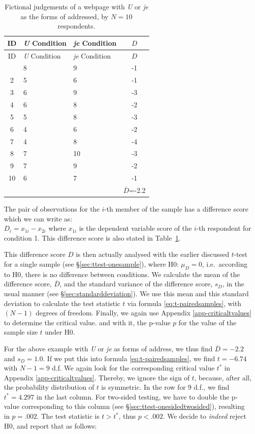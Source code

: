 \documentclass[
]{book}
\begin{document}
\begin{longtable}[]{@{}cllc@{}}
\caption{\label{tab:data-uje-paired} Fictional judgements of a webpage
with \emph{U} or \emph{je} as the forms of addressed, by \(N=10\) respondents.}\tabularnewline
\toprule\noalign{}
ID & \emph{U} Condition & \emph{je} Condition & \(D\) \\
\midrule\noalign{}
\endfirsthead
\toprule\noalign{}
ID & \emph{U} Condition & \emph{je} Condition & \(D\) \\
\midrule\noalign{}
\endhead
\bottomrule\noalign{}
\endlastfoot
1 & 8 & 9 & -1 \\
2 & 5 & 6 & -1 \\
3 & 6 & 9 & -3 \\
4 & 6 & 8 & -2 \\
5 & 5 & 8 & -3 \\
6 & 4 & 6 & -2 \\
7 & 4 & 8 & -4 \\
8 & 7 & 10 & -3 \\
9 & 7 & 9 & -2 \\
10 & 6 & 7 & -1 \\
& & & \(\overline{D}\)=-2.2 \\
\end{longtable}

The pair of observations for the \(i\)-th member of the sample has a
difference score which we can write as:\\
\(D_i = x_{1i} - x_{2i}\) where \(x_{1i}\) is the dependent
variable score of the \(i\)-th respondent for condition 1. This
difference score is also stated in
Table~\ref{tab:data-uje-paired}.

This difference score \(D\) is then actually analysed with the earlier discussed \(t\)-test for a single sample (see §\ref{sec:ttest-onesample}), where H0: \(\mu_D=0\), i.e.~according to H0, there is no
difference between conditions. We calculate the mean of the difference score,
\(\overline{D}\), and the standard variance of the difference score, \(s_{D}\),
in the usual manner (see
§\ref{sec:standarddeviation}). We use this mean and this
standard deviation to calculate the test statistic \(t\) via formula
\eqref{eq:t-pairedsamples}, with \((N-1)\) degrees of freedom. Finally,
we again use
Appendix \ref{app-criticaltvalues} to determine the critical value.
and with it, the p-value \(p\) for the value of the sample size
\(t\) under H0.

For the above example with \emph{U} or \emph{je} as forms of address,
we thus find \(\overline{D}=-2.2\) and \(s_D=1.0\). If we put this into
formula \eqref{eq:t-pairedsamples}, we find \(t=-6.74\) with \(N-1=9\) d.f.
We again look for the corresponding critical value \(t^*\)
in Appendix \ref{app-criticaltvalues}. Thereby, we ignore the sign of \(t\),
because, after all, the probability distribution of \(t\) is symmetric.
In the row for 9 d.f., we find \(t^*=4.297\) in the last column.
For two-sided testing, we have to double the p-value corresponding to this
column (see
§\ref{sec:ttest-onesidedtwosided}), resulting in \(p=.002\).
The test statistic is \(t > t^*\), thus \(p<.002\). We decide to
\emph{indeed} reject H0, and report that as follows:
\end{document}
